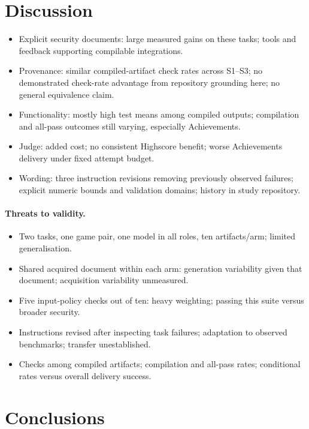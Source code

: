 \section{Discussion}
\label{sec:discussion}

\begin{itemize}
\item Explicit security documents: large measured gains on these tasks;
tools and feedback supporting compilable integrations.
\item Provenance: similar compiled-artifact check rates across S1--S3;
no demonstrated check-rate advantage from repository grounding here;
no general equivalence claim.
\item Functionality: mostly high test means among compiled outputs;
compilation and all-pass outcomes still varying, especially Achievements.
\item Judge: added cost; no consistent Highscore benefit;
worse Achievements delivery under fixed attempt budget.
\item Wording: three instruction revisions removing previously observed
failures; explicit numeric bounds and validation domains;
history in study repository.
\end{itemize}

\paragraph{Threats to validity.}
\begin{itemize}
\item Two tasks, one game pair, one model in all roles, ten artifacts/arm;
limited generalisation.
\item Shared acquired document within each arm: generation variability
given that document; acquisition variability unmeasured.
\item Five input-policy checks out of ten: heavy weighting;
passing this suite versus broader security.
\item Instructions revised after inspecting task failures;
adaptation to observed benchmarks; transfer unestablished.
\item Checks among compiled artifacts; compilation and all-pass rates;
conditional rates versus overall delivery success.
\end{itemize}

\section{Conclusions}
\label{sec:conclusions}

